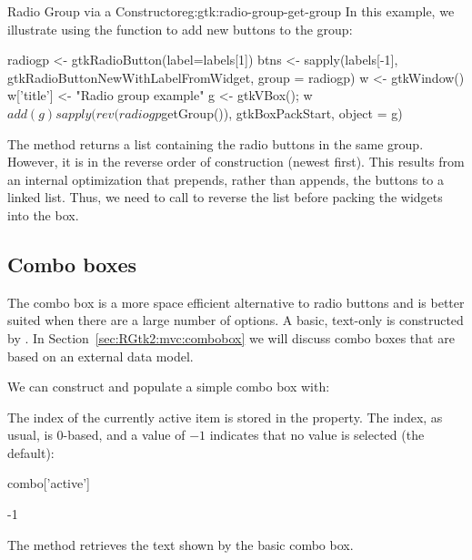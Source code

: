 \begin{example}{Radio Group via a 
    Constructor}{eg:gtk:radio-group-get-group}
  In this example, we illustrate using the
   function to add
  new buttons to the group:
\begin{Schunk}
\begin{Sinput}
 radiogp <- gtkRadioButton(label=labels[1])
 btns <- sapply(labels[-1], gtkRadioButtonNewWithLabelFromWidget, 
                group = radiogp)
 w <- gtkWindow()
 w['title'] <- "Radio group example"
 g <- gtkVBox(); w$add(g)
 sapply(rev(radiogp$getGroup()), gtkBoxPackStart, object = g)
\end{Sinput}
\end{Schunk}
%
The  method returns a list containing
the radio buttons in the same group. However, it is in the reverse
order of construction (newest first). This results from an internal
optimization that prepends, rather than appends, the buttons to a
linked list. Thus, we need to call  to reverse the list
before packing the widgets into the box.

\end{example}

\subsection{Combo boxes}
\label{sec:RGtk2:basic-combobox}

The combo box is a more space efficient alternative to radio buttons
and is better suited when there are a large number of options. A
basic, text-only  is constructed by
. In
Section~\ref{sec:RGtk2:mvc:combobox} we will discuss combo boxes that
are based on an external data model.

We can construct and populate a simple combo box with:
\begin{Schunk}
\end{Schunk}
%

The index of the currently active item is stored in the
 property. The index, as usual, is $0$-based,
and a value of $-1$ indicates that no value is selected (the default):
\begin{Schunk}
\begin{Sinput}
 combo['active']
\end{Sinput}
\begin{Soutput}
[1] -1
\end{Soutput}
\end{Schunk}
%
The  method retrieves
the text shown by the basic combo box.

